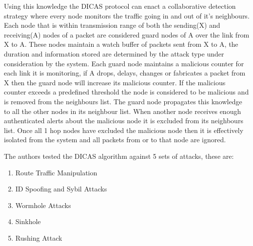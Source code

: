 Using this knowledge the DICAS protocol can enact a collaborative detection strategy where every node monitors the traffic going in and out of it's neighbours. Each node that is within transmission range of both the sending(X) and receiving(A) nodes of a packet are considered guard nodes of A over the link from X to A. These nodes maintain a watch buffer of packets sent from X to A, the duration and information stored are determined by the attack type under consideration by the system. Each guard node maintains a malicious counter for each link it is monitoring, if A drops, delays, changes or fabricates a packet from X then the guard node will increase its malicious counter. If the malicious counter exceeds a predefined threshold the node is considered to be malicious and is removed from the neighbours list. The guard node propagates this knowledge to all the other nodes in its neighbour list. When another node receives enough authenticated alerts about the malicious node it is excluded from its neighbours list. Once all 1 hop nodes have excluded the malicious node then it is effectively isolated from the system and all packets from or to that node are ignored.      

The authors tested the DICAS algorithm against 5 sets of attacks, these are:
\begin{enumerate}

\item Route Traffic Manipulation

\item ID Spoofing and Sybil Attacks

\item Wormhole Attacks

\item Sinkhole

\item Rushing Attack

\end{enumerate}

